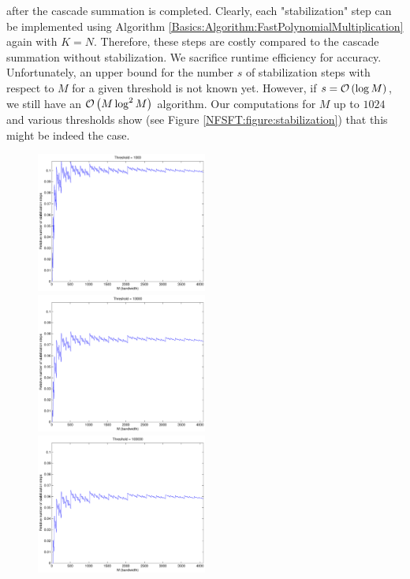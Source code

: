 after the cascade summation is completed. Clearly, each "stabilization" step can be implemented using Algorithm \ref{Basics:Algorithm:FastPolynomialMultiplication} 
again with $K = N$. Therefore, these steps are costly compared to the cascade summation without stabilization. We sacrifice runtime efficiency for accuracy. 
Unfortunately, an upper bound for the number $s$ of stabilization steps with respect to $M$ for a given threshold is not known yet. However, if $s = \mathcal{O}\left(\log M\right) $, 
we still have an $\mathcal{O}\left(M \log^2 M\right)$ algorithm. Our computations for $M$ up to $1024$ and various thresholds show (see Figure \ref{NFSFT:figure:stabilization}) 
that this might be indeed the case. 
\begin{figure}[htb]
  \centering
   \subfigure
     {\includegraphics[width=0.5\textwidth]{images/stabilization1000}}\hfill
   \subfigure
     {\includegraphics[width=0.5\textwidth]{images/stabilization10000}}\\
   \subfigure
     {\includegraphics[width=0.5\textwidth]{images/stabilization100000}}\hfill

\end{figure}
